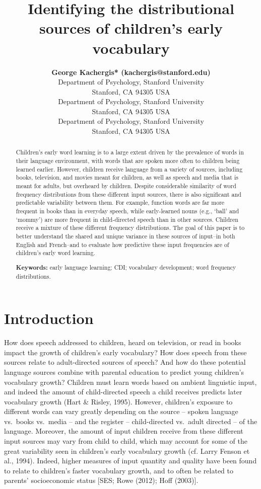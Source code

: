 \documentclass[10pt, letterpaper]{article}
\title{Identifying the distributional sources of children's early
vocabulary}
\author{{\large \bf George Kachergis* (kachergis@stanford.edu)} \\ Department of Psychology, Stanford University \\ Stanford, CA 94305 USA \AND {\large \bf Georgia Loukatou* (@stanford.edu)} \\ Department of Psychology, Stanford University \\ Stanford, CA 94305 USA \AND {\large \bf Michael C. Frank (mcfrank@stanford.edu)} \\ Department of Psychology, Stanford University \\ Stanford, CA 94305 USA}
\begin{document}
\maketitle

\begin{abstract}
Children's early word learning is to a large extent driven by the
prevalence of words in their language environment, with words that are
spoken more often to children being learned earlier. However, children
receive language from a variety of sources, including books, television,
and movies meant for children, as well as speech and media that is meant
for adults, but overheard by children. Despite considerable similarity
of word frequency distributions from these different input sources,
there is also significant and predictable variability between them. For
example, function words are far more frequent in books than in everyday
speech, while early-learned nouns (e.g., `ball' and `mommy') are more
frequent in child-directed speech than in other sources. Children
receive a mixture of these different frequency distributions. The goal
of this paper is to better understand the shared and unique variance in
these sources of input--in both English and French--and to evaluate how
predictive these input frequencies are of children's early word
learning.

\textbf{Keywords:}
early language learning; CDI; vocabulary development; word frequency
distributions.
\end{abstract}

\hypertarget{introduction}{%
\section{Introduction}\label{introduction}}

How does speech addressed to children, heard on television, or read in
books impact the growth of children's early vocabulary? How does speech
from these sources relate to adult-directed sources of speech? And how
do these potential language sources combine with parental education to
predict young children's vocabulary growth? Children must learn words
based on ambient linguistic input, and indeed the amount of
child-directed speech a child receives predicts later vocabulary growth
(Hart \& Risley, 1995). However, children's exposure to different words
can vary greatly depending on the source -- spoken language vs.~books
vs.~media -- and the register -- child-directed vs.~adult directed -- of
the language. Moreover, the amount of input children receive from these
different input sources may vary from child to child, which may account
for some of the great variability seen in children's early vocabulary
growth (cf. Larry Fenson et al., 1994). Indeed, higher measures of input
quantity and quality have been found to relate to children's faster
vocabulary growth, and to often be related to parents' socioeconomic
status {[}SES; Rowe (2012); Hoff (2003){]}.
\end{document}

